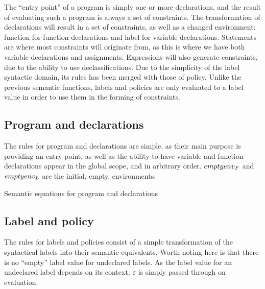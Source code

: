 The ``entry point'' of a \thelang{} program is simply one or more declarations, and the result of evaluating such a program is always a set of constraints.
The transformation of declarations will result in a set of constraints, as well as a changed environment: function for function declarations and label for variable declarations.
Statements are where most constraints will originate from, as this is where we have both variable declarations and assignments.
Expressions will also generate constraints, due to the ability to use declassifications.
Due to the simplicity of the label syntactic domain, its rules has been merged with those of policy.
Unlike the previous semantic functions, labels and policies are only evaluated to a label value in order to use them in the forming of constraints.

\subsection{Program and declarations}
The rules for program and declarations are simple, as their main purpose is providing an entry point, as well as the ability to have variable and function declarations appear in the global scope, and in arbitrary order.
$empty{env_F}$ and $empty{env_L}$ are the initial, empty, environments.

\begin{table}[H]
\begin{semanticequations}
 \seSpace
 \seSpace
 \seSpace
\end{semanticequations}
\caption{Semantic equations for program and declarations}
\label{cstr:program_declarations}
\end{table}

\subsection{Label and policy}
The rules for labels and policies consist of a simple transformation of the syntactical labels into their semantic equivalents.
Worth noting here is that there is no ``empty'' label value for undeclared labels.
As the label value for an undeclared label depends on its context, $\varepsilon$ is simply passed through on evaluation.


